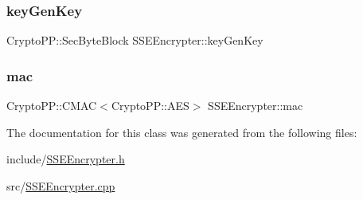 \mbox{\label{classSSEEncrypter_a35dbd89d8820118bf71d6cd483e64ac8}} 
\subsubsection{\texorpdfstring{key\+Gen\+Key}{keyGenKey}}
{\footnotesize\ttfamily Crypto\+P\+P\+::\+Sec\+Byte\+Block S\+S\+E\+Encrypter\+::key\+Gen\+Key\hspace{0.3cm}{\ttfamily [private]}}

\mbox{\label{classSSEEncrypter_a67939726bb84cb761535642873c3b10c}} 
\subsubsection{\texorpdfstring{mac}{mac}}
{\footnotesize\ttfamily Crypto\+P\+P\+::\+C\+M\+AC$<$Crypto\+P\+P\+::\+A\+ES$>$ S\+S\+E\+Encrypter\+::mac\hspace{0.3cm}{\ttfamily [private]}}



The documentation for this class was generated from the following files\+:\begin{DoxyCompactItemize}
\item 
include/\hyperlink{SSEEncrypter_8h}{S\+S\+E\+Encrypter.\+h}\item 
src/\hyperlink{SSEEncrypter_8cpp}{S\+S\+E\+Encrypter.\+cpp}\end{DoxyCompactItemize}
